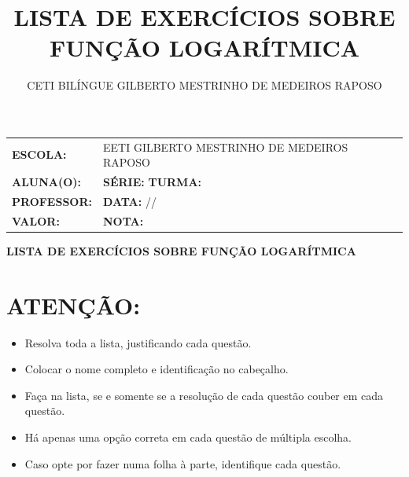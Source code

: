 \documentclass[12pt]{article}
\title{LISTA DE EXERCÍCIOS SOBRE FUNÇÃO LOGARÍTMICA}
\author{CETI BILÍNGUE GILBERTO MESTRINHO DE MEDEIROS RAPOSO}
\date{}
\begin{document}
    \thispagestyle{empty}
    \vspace{0.5cm}
    \begin{center}
        \large
        \begin{tabular}{|l l|}
            \hline
            \textbf{ESCOLA:} & EETI GILBERTO MESTRINHO DE MEDEIROS RAPOSO \\ 
            \textbf{ALUNA(O):} & \underline{\hspace{7cm}} \textbf{SÉRIE:} \underline{\hspace{1.5cm}} \textbf{TURMA:} \underline{\hspace{1.5cm}} \\
            \textbf{PROFESSOR:} & \underline{\hspace{7cm}} \textbf{DATA:} \underline{\hspace{1.5cm}}/\underline{\hspace{1.5cm}}/\underline{\hspace{1.5cm}} \\
            \textbf{VALOR:} & \underline{\hspace{3cm}} \textbf{NOTA:} \underline{\hspace{1.5cm}} \\
            \hline
        \end{tabular}
    \end{center}
    \vspace{0.5cm}
    
    \begin{center}
        \Large\textbf{LISTA DE EXERCÍCIOS SOBRE FUNÇÃO LOGARÍTMICA}
    \end{center}
    
    \vspace{0.3cm}
    
    \section*{ATENÇÃO:}
    \begin{itemize}[noitemsep]
        \item Resolva toda a lista, justificando cada questão.
        \item Colocar o nome completo e identificação no cabeçalho.
        \item Faça na lista, se e somente se a resolução de cada questão couber em cada questão.
        \item Há apenas uma opção correta em cada questão de múltipla escolha.
        \item Caso opte por fazer numa folha à parte, identifique cada questão.
    \end{itemize}
    
\end{document}
